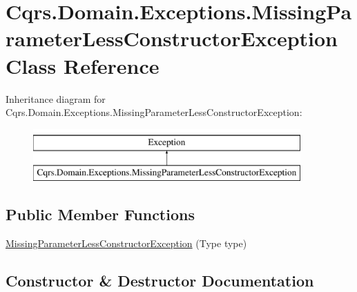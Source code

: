 \hypertarget{classCqrs_1_1Domain_1_1Exceptions_1_1MissingParameterLessConstructorException}{}\section{Cqrs.\+Domain.\+Exceptions.\+Missing\+Parameter\+Less\+Constructor\+Exception Class Reference}
\label{classCqrs_1_1Domain_1_1Exceptions_1_1MissingParameterLessConstructorException}
Inheritance diagram for Cqrs.\+Domain.\+Exceptions.\+Missing\+Parameter\+Less\+Constructor\+Exception\+:\begin{figure}[H]
\begin{center}
\leavevmode
\includegraphics[height=2.000000cm]{classCqrs_1_1Domain_1_1Exceptions_1_1MissingParameterLessConstructorException}
\end{center}
\end{figure}
\subsection*{Public Member Functions}
\begin{DoxyCompactItemize}
\item 
\hyperlink{classCqrs_1_1Domain_1_1Exceptions_1_1MissingParameterLessConstructorException_a5de10c873bab008d2527ff96fdf5f6b2}{Missing\+Parameter\+Less\+Constructor\+Exception} (Type type)
\end{DoxyCompactItemize}


\subsection{Constructor \& Destructor Documentation}
\mbox{\label{classCqrs_1_1Domain_1_1Exceptions_1_1MissingParameterLessConstructorException_a5de10c873bab008d2527ff96fdf5f6b2}} 

